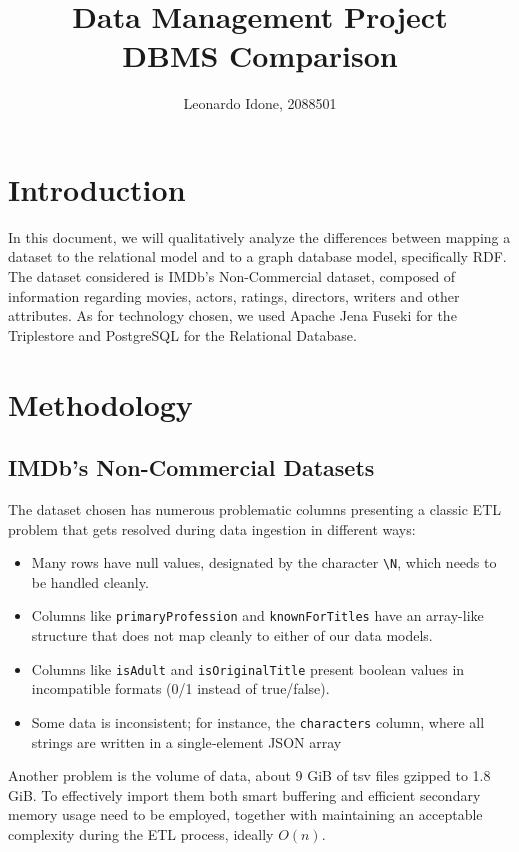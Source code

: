 \documentclass[a4paper,10pt]{article}
\title{Data Management Project \\
  \large DBMS Comparison}
\author{Leonardo Idone, 2088501}
\begin{document}
\maketitle

\section{Introduction}

In this document, we will qualitatively analyze the differences
between mapping a dataset to the relational model and to a graph
database model, specifically RDF. The dataset considered is IMDb's
Non-Commercial dataset, composed of information regarding movies,
actors, ratings, directors, writers and other attributes. As for
technology chosen, we used Apache Jena Fuseki for the Triplestore and
PostgreSQL for the Relational Database.

\section{Methodology}
\subsection{IMDb's Non-Commercial Datasets}

The dataset chosen has numerous problematic columns presenting a
classic ETL problem that gets resolved during data ingestion in
different ways:

\begin{itemize}{}
  \item Many rows have null values, designated by the character
  \texttt{\textbackslash N}, which needs to be handled cleanly.
  \item Columns like \texttt{primaryProfession} and
  \texttt{knownForTitles} have an array-like structure that does not
  map cleanly to either of our data models.
  \item Columns like \texttt{isAdult} and \texttt{isOriginalTitle}
  present boolean values in incompatible formats (0/1 instead of
  true/false).
  \item Some data is inconsistent; for instance, the
  \texttt{characters} column, where all strings are written in a
  single‑element JSON array
\end{itemize}

Another problem is the volume of data, about 9 GiB of tsv files gzipped
to 1.8 GiB. To effectively import them both smart buffering and
efficient secondary memory usage need to be employed, together with
maintaining an acceptable complexity during the ETL process, ideally
$O(n)$.
\end{document}
